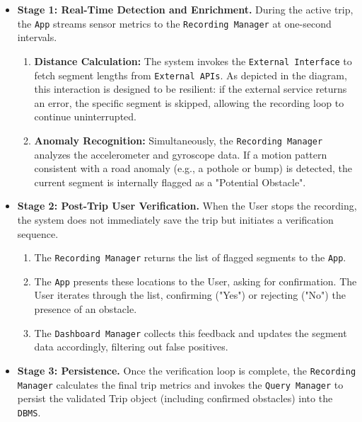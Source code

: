 \begin{itemize}
    \item \textbf{Stage 1: Real-Time Detection and Enrichment.} 
    During the active trip, the \texttt{App} streams sensor metrics to the \texttt{Recording Manager} at one-second intervals.
    \begin{enumerate}
        \item \textbf{Distance Calculation:} The system invokes the \texttt{External Interface} to fetch segment lengths from \texttt{External APIs}. As depicted in the diagram, this interaction is designed to be resilient: if the external service returns an error, the specific segment is skipped, allowing the recording loop to continue uninterrupted.
        \item \textbf{Anomaly Recognition:} Simultaneously, the \texttt{Recording Manager} analyzes the accelerometer and gyroscope data. If a motion pattern consistent with a road anomaly (e.g., a pothole or bump) is detected, the current segment is internally flagged as a "Potential Obstacle".
    \end{enumerate}

    \item \textbf{Stage 2: Post-Trip User Verification.}
    When the User stops the recording, the system does not immediately save the trip but initiates a verification sequence.
    \begin{enumerate}
        \item The \texttt{Recording Manager} returns the list of flagged segments to the \texttt{App}.
        \item The \texttt{App} presents these locations to the User, asking for confirmation. The User iterates through the list, confirming ("Yes") or rejecting ("No") the presence of an obstacle.
        \item The \texttt{Dashboard Manager} collects this feedback and updates the segment data accordingly, filtering out false positives.
    \end{enumerate}

    \item \textbf{Stage 3: Persistence.}
    Once the verification loop is complete, the \texttt{Recording Manager} calculates the final trip metrics and invokes the \texttt{Query Manager} to persist the validated Trip object (including confirmed obstacles) into the \texttt{DBMS}.
\end{itemize}








